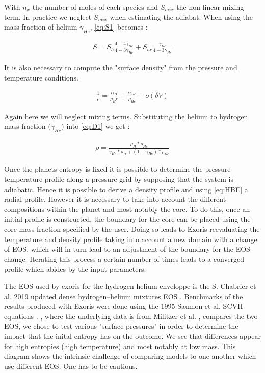 With $n_x$ the number of moles of each species and $S_{mix}$ the non linear mixing term. In practice we neglect $S_{mix}$ when estimating the adiabat. When using the mass fraction of helium $\gamma_{He}$, \cref{eq:S1} becomes :

\begin{align}
    S = S_{h}\frac{4-4\gamma_{He}}{4-3\gamma_{He}} + S_{he}\frac{\gamma_{He}}{4-3\gamma_{He}} \label{eq:S2}
\end{align}

It is also necessary to compute the "surface density" from the pressure and temperature conditions.

\begin{align}
    \frac{1}{\rho} = \frac{\alpha_H}{\rho_He} +  \frac{\alpha_{He}}{\rho_{He}} +  o(\delta V) \label{eq:D1}
\end{align}

Again here we will neglect mixing terms. Substituting the helium to hydrogen mass fraction ($\gamma_{He}$) into \cref{eq:D1} we get :

\begin{align}
    \rho = \frac{\rho_H*\rho_{He}}{\gamma_{He}*\rho_H + (1-\gamma_{He})*\rho_{He}} \label{eq:D2}
\end{align}

Once the planets entropy is fixed it is possible to determine the pressure temperature profile along a pressure grid by supposing that the system is adiabatic. Hence it is possible to derive a density profile and using \cref{eq:HBE} a radial profile. However it is necessary to take into account the different compositions within the planet and most notably the core. To do this, once an initial profile is constructed, the boundary for the core can be placed using the core mass fraction specified by the user. Doing so leads to Exoris reevaluating the temperature and density profile taking into account a new domain with a change of EOS, which will in turn lead to an adjustment of the boundary for the EOS change. Iterating this process a certain number of times leads to a converged profile which abides by the input parameters.\par

The EOS used by exoris for the hydrogen helium enveloppe is the S. Chabrier et al. 2019 updated dense hydrogen–helium mixtures EOS \parencite{chabrier_new_2019}. Benchmarks of the results produced with Exoris were done using the 1995 Saumon et al. SCVH equations \parencite{saumon_equation_1995}. ,  where the underlying data is from Militzer et al. \parencite{militzer_ab_2013}, compares the two EOS, we chose to test various "surface pressures" in order to determine the impact that the inital entropy has on the outcome. We see that differences appear for high entropies (high temperature) and most notably at low mass. This diagram shows the intrinsic challenge of comparing models to one another which use different EOS. One has to be cautious. \par

